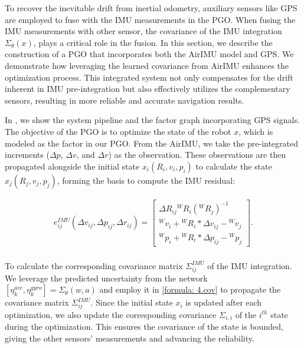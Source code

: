 To recover the inevitable drift from inertial odometry, auxiliary sensors like GPS are employed to fuse with the IMU measurements in the PGO.
When fusing the IMU measurements with other sensor, the covariance of the IMU integration $\Sigma_\theta(x)$, plays a critical role in the fusion.
In this section, we describe the construction of a PGO that incorporates both the AirIMU model and GPS.
We demonstrate how leveraging the learned covariance from AirIMU enhances the optimization process.
This integrated system not only compensates for the drift inherent in IMU pre-integration but also effectively utilizes the complementary sensors, resulting in more reliable and accurate navigation results.

In , we show the system pipeline and the factor graph incorporating GPS signals.
The objective of the PGO is to optimize the state of the robot $x$, which is modeled as the factor in our PGO.
From the AirIMU, we take the pre-integrated increments ($\Delta p$, $\Delta v$, and $\Delta r$) as the observation.
These observations are then propagated alongside the initial state $x_i (R_i, v_i, p_i)$ to calculate the state $x_j (R_j, v_j, p_j)$, forming the basis to compute the IMU residual:

\begin{equation}
\begin{aligned}
    e^{IMU}_{ij}(\Delta v_{ij}, \Delta p_{ij}, \Delta r_{ij}) = \begin{bmatrix}
        {\Delta}R_{ij} {}^WR_i  ({}^WR_j)^{-1} \\
       {}^Wv_i + {}^WR_i * {\Delta}v_{ij}  - {}^Wv_j\\
         {}^Wp_i + {}^WR_i * {\Delta}p_{ij}  - {}^Wp_j
    \end{bmatrix}.\\
\end{aligned}
\end{equation}

To calculate the corresponding covariance matrix $\Sigma^{IMU}_{ij}$ of the IMU integration. 
We leverage the predicted uncertainty from the network $[\eta^{acc}_k, \eta^{gyro}_k] = \Sigma_\theta(w, a)$ and employ it in \eqref{formula: 4.cov} to propagate the covariance matrix $\Sigma^{IMU}_{ij}$.
Since the initial state $x_i$ is updated after each optimization, we also update the corresponding covariance $\Sigma_{i,i}$ of the $i^{th}$ state during the optimization.
This ensures the covariance of the state is bounded, giving the other sensors' measurements and advancing the reliability.

